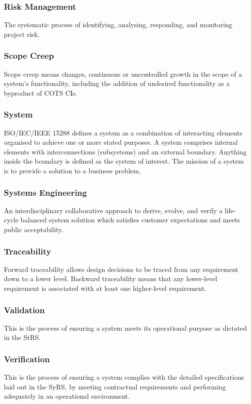 \documentclass[journal]{IEEEtran}
\begin{document}
\subsubsection{Risk Management}
The systematic process of identifying, analysing, responding, and monitoring
project risk.
\subsubsection{Scope Creep}
Scope creep means changes, continuous or uncontrolled growth in the scope of a system's functionality, including the addition of undesired functionality as a byproduct of COTS CIs.
\subsubsection{System}
ISO/IEC/IEEE 15288 defines a system as a combination of interacting elements organised to achieve one or more stated purposes. A system comprises internal elements with interconnections (subsystems) and an external boundary. Anything inside the boundary is defined as the system of interest. The mission of a system is to provide a solution to a business problem.
\subsubsection{Systems Engineering}
An interdisciplinary collaborative approach to derive, evolve, and verify a life-cycle balanced system solution which satisfies customer expectations and meets public acceptability.
\subsubsection{Traceability}
Forward	traceability	allows design decisions to be	traced from any requirement down	to a	lower level. Backward	 traceability means that any lower-level requirement is associated with at least one higher-level requirement.
\subsubsection{Validation}
This is the process of ensuring a system meets its operational purpose as dictated in the StRS.
\subsubsection{Verification}
This is the process of ensuring a system complies with the detailed specifications laid out in the SyRS, by meeting contractual requirements and performing adequately in an operational environment.
\end{document}
